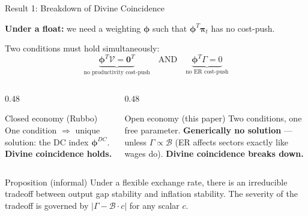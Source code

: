 \documentclass[aspectratio=169]{beamer}
\begin{document}
\begin{frame}{Result 1: Breakdown of Divine Coincidence}

\textbf{Under a float:} we need a weighting $\bm{\phi}$ such that $\bm{\phi}^T\bm{\pi}_t$ has no cost-push.

Two conditions must hold simultaneously:
\begin{equation*}
    \underbrace{\bm{\phi}^T\mathcal{V} = \mathbf{0}^T}_{\text{no productivity cost-push}} \quad \text{AND} \quad \underbrace{\bm{\phi}^T\Gamma = 0}_{\text{no ER cost-push}}
\end{equation*}

\begin{columns}
\begin{column}{0.48\textwidth}
\begin{alertblock}{Closed economy (Rubbo)}
One condition $\Rightarrow$ unique solution: the DC index $\bm{\phi}^{DC}$. \textbf{Divine coincidence holds.}
\end{alertblock}
\end{column}
\begin{column}{0.48\textwidth}
\begin{alertblock}{Open economy (this paper)}
Two conditions, one free parameter. \textbf{Generically no solution} --- unless $\Gamma \propto \mathcal{B}$ (ER affects sectors exactly like wages do). \textbf{Divine coincidence breaks down.}
\end{alertblock}
\end{column}
\end{columns}

\vspace{0.3cm}
\begin{exampleblock}{Proposition (informal)}
Under a flexible exchange rate, there is an irreducible tradeoff between output gap stability and inflation stability. The severity of the tradeoff is governed by $|\Gamma - \mathcal{B} \cdot c|$ for any scalar $c$.
\end{exampleblock}
\end{frame}
\end{document}
